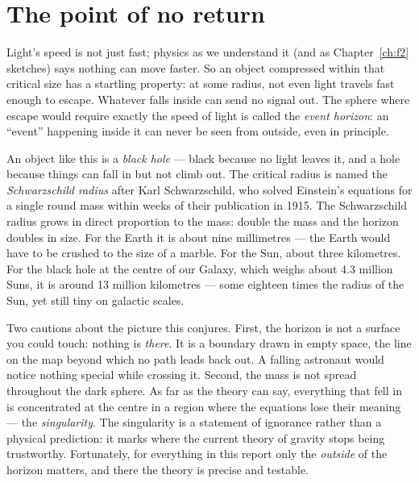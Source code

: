 \section{The point of no return}

Light's speed is not just fast; physics as we understand it (and as
Chapter~\ref{ch:f2} sketches) says nothing can move faster. So an object
compressed within that critical size has a startling property: at some
radius, not even light travels fast enough to escape. Whatever falls inside
can send no signal out. The sphere where escape would require exactly the
speed of light is called the \emph{event horizon}: an ``event'' happening
inside it can never be seen from outside, even in principle.

An object like this is a \emph{black hole} — black because no light leaves
it, and a hole because things can fall in but not climb out. The critical
radius is named the \emph{Schwarzschild radius} after Karl Schwarzschild,
who solved Einstein's equations for a single round mass within weeks of
their publication in 1915. The Schwarzschild radius grows in direct
proportion to the mass: double the mass and the horizon doubles in size.
For the Earth it is about nine millimetres — the Earth would have to be
crushed to the size of a marble. For the Sun, about three kilometres. For
the black hole at the centre of our Galaxy, which weighs about 4.3 million
Suns, it is around 13 million kilometres — some eighteen times the radius
of the Sun, yet still tiny on galactic scales.

Two cautions about the picture this conjures. First, the horizon is not a
surface you could touch: nothing is \emph{there}. It is a boundary drawn in
empty space, the line on the map beyond which no path leads back out. A
falling astronaut would notice nothing special while crossing it. Second,
the mass is not spread throughout the dark sphere. As far as the theory can
say, everything that fell in is concentrated at the centre in a region
where the equations lose their meaning — the \emph{singularity}. The
singularity is a statement of ignorance rather than a physical prediction:
it marks where the current theory of gravity stops being trustworthy.
Fortunately, for everything in this report only the \emph{outside} of the
horizon matters, and there the theory is precise and testable.


